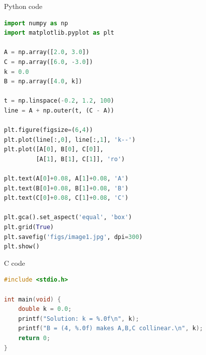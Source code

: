 \documentclass{beamer}
\begin{document}
\begin{frame}[fragile]{Python code}
\small
\begin{lstlisting}[language=Python]
import numpy as np
import matplotlib.pyplot as plt

A = np.array([2.0, 3.0])
C = np.array([6.0, -3.0])
k = 0.0
B = np.array([4.0, k])

t = np.linspace(-0.2, 1.2, 100)
line = A + np.outer(t, (C - A))

plt.figure(figsize=(6,4))
plt.plot(line[:,0], line[:,1], 'k--')
plt.plot([A[0], B[0], C[0]],
         [A[1], B[1], C[1]], 'ro')

plt.text(A[0]+0.08, A[1]+0.08, 'A')
plt.text(B[0]+0.08, B[1]+0.08, 'B')
plt.text(C[0]+0.08, C[1]+0.08, 'C')

plt.gca().set_aspect('equal', 'box')
plt.grid(True)
plt.savefig('figs/image1.jpg', dpi=300)
plt.show()
\end{lstlisting}
\end{frame}

\begin{frame}[fragile]{C code}
\small
\begin{lstlisting}[language=C]
#include <stdio.h>

int main(void) {
    double k = 0.0;
    printf("Solution: k = %.0f\n", k);
    printf("B = (4, %.0f) makes A,B,C collinear.\n", k);
    return 0;
}
\end{lstlisting}
\end{frame}
\end{document}
